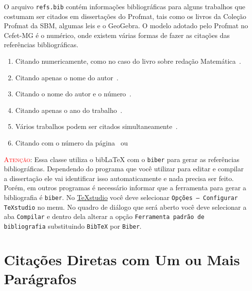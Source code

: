 O arquivo \texttt{refs.bib}
contém informações bibliográficas para alguns trabalhos que
costumam ser citados em dissertações do Profmat,
tais como os livros da Coleção Profmat da SBM, algumas leis e o GeoGebra.
O modelo adotado pelo Profmat no Cefet-MG é o numérico, onde
existem várias formas de fazer as citações das referências bibliográficas.
\begin{enumerate}[label=\alph*)]
  \item Citando numericamente, como no caso do livro sobre redação
        Matemática~\cite{burden2010numerical}.
  \item Citando apenas o nome do autor~\citeauthor{burden2010numerical}.
  \item Citando o nome do autor e o número~\textcite{burden2010numerical}.
  \item Citando apenas o ano do trabalho~\citeyear{burden2010numerical}.
  \item Vários trabalhos podem ser citados
        simultaneamente~\textcite{burden2010numerical,SOUZA:Bayesiana,chapra2015applied}.
  \item Citando com o número da página~\cite[10]{burden2010numerical}
        ou~\textcite[10]{burden2010numerical}
\end{enumerate}

\textcolor{red}{\textsc{Atenção}}: Essa classe utiliza o bib\LaTeX{} com o
\texttt{biber} para gerar as referências bibliográficas. Dependendo do
programa que você utilizar para editar e compilar a dissertação ele vai
identificar isso automaticamente e nada precisa ser feito.
Porém, em outros programas é necessário informar que a ferramenta
para gerar a bibliografia é \texttt{biber}. No
\href{https://www.texstudio.org}{TeXstudio} você deve selecionar
\texttt{Opções -- Configurar TeXstudio} no menu. No quadro de diálogo
que será aberto você deve selecionar a aba \texttt{Compilar}
e dentro dela alterar a opção \texttt{Ferramenta padrão de bibliografia}
substituindo \texttt{BibTeX} por \texttt{Biber}.

\section{Citações Diretas com Um ou Mais Parágrafos}
\label{sec:Citacoes_Diretas_com_Um_ou_Mais_Paragrafos}

